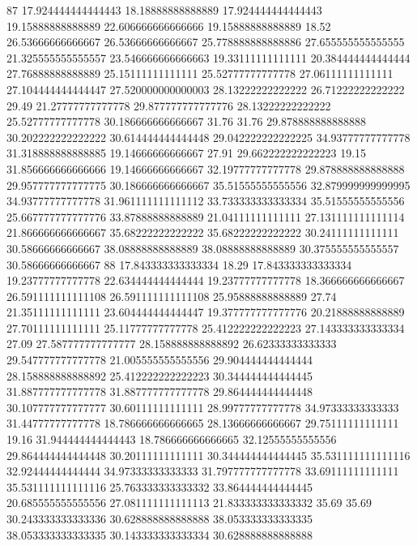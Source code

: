 87 17.924444444444443 18.18888888888889 17.924444444444443 19.15888888888889 22.606666666666666 19.15888888888889 18.52 26.53666666666667 26.53666666666667 25.778888888888886 27.655555555555555 21.325555555555557 23.546666666666663 19.33111111111111 20.384444444444444 27.76888888888889 25.15111111111111 25.52777777777778 27.06111111111111 27.104444444444447 27.520000000000003 28.13222222222222 26.71222222222222 29.49 21.27777777777778 29.877777777777776 28.13222222222222 25.52777777777778 30.186666666666667 31.76 31.76 29.878888888888888 30.202222222222222 30.614444444444448 29.042222222222225 34.93777777777778 31.318888888888885 19.14666666666667 27.91 29.662222222222223 19.15 31.856666666666666 19.14666666666667 32.19777777777778 29.878888888888888 29.957777777777775 30.186666666666667 35.51555555555556 32.879999999999995 34.93777777777778 31.961111111111112 33.733333333333334 35.51555555555556 25.667777777777776 33.87888888888889 21.04111111111111 27.131111111111114 21.866666666666667 35.68222222222222 35.68222222222222 30.24111111111111 30.58666666666667 38.08888888888889 38.08888888888889 30.375555555555557 30.58666666666667
88 17.843333333333334 18.29 17.843333333333334 19.23777777777778 22.634444444444444 19.23777777777778 18.366666666666667 26.591111111111108 26.591111111111108 25.95888888888889 27.74 21.35111111111111 23.604444444444447 19.377777777777776 20.21888888888889 27.70111111111111 25.11777777777778 25.412222222222223 27.143333333333334 27.09 27.587777777777777 28.158888888888892 26.62333333333333 29.547777777777778 21.005555555555556 29.904444444444444 28.158888888888892 25.412222222222223 30.344444444444445 31.887777777777778 31.887777777777778 29.864444444444448 30.107777777777777 30.60111111111111 28.99777777777778 34.97333333333333 31.44777777777778 18.786666666666665 28.13666666666667 29.75111111111111 19.16 31.944444444444443 18.786666666666665 32.12555555555556 29.864444444444448 30.20111111111111 30.344444444444445 35.531111111111116 32.92444444444444 34.97333333333333 31.797777777777778 33.69111111111111 35.531111111111116 25.763333333333332 33.864444444444445 20.685555555555556 27.081111111111113 21.833333333333332 35.69 35.69 30.243333333333336 30.628888888888888 38.053333333333335 38.053333333333335 30.143333333333334 30.628888888888888
